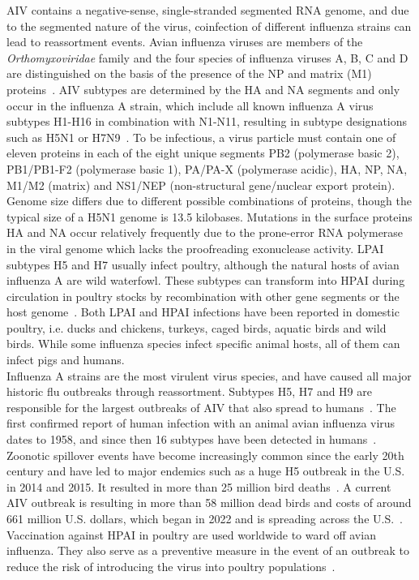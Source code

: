 \ac{AIV} contains a negative-sense, single-stranded segmented \ac{RNA} genome, and due to the segmented nature of the virus, coinfection of different influenza strains can lead to reassortment events. Avian influenza viruses are members of the \textit{Orthomyxoviridae} family and the four species of influenza viruses A, B, C and D are distinguished on the basis of the presence of the \ac{NP} and matrix (M1) proteins~\cite{webster1992evolution}. \ac{AIV} subtypes are determined by the \ac{HA} and \ac{NA} segments and only occur in the influenza A strain, which include all known influenza A virus subtypes H1-H16 in combination with N1-N11, resulting in subtype designations such as H5N1 or H7N9~\cite{webster1992evolution, krammer2018influenza}. To be infectious, a virus particle must contain one of eleven proteins in each of the eight unique segments PB2 (polymerase basic 2), PB1/PB1-F2 (polymerase basic 1), PA/PA-X (polymerase acidic), \ac{HA}, \ac{NP}, \ac{NA}, M1/M2 (matrix) and NS1/NEP (non-structural gene/nuclear export protein). Genome size differs due to different possible combinations of proteins, though the typical size of a H5N1 genome is 13.5 kilobases. Mutations in the surface proteins \ac{HA} and \ac{NA} occur relatively frequently due to the prone-error \ac{RNA} polymerase in the viral genome which lacks the proofreading exonuclease activity. \ac{LPAI} subtypes H5 and H7 usually infect poultry, although the natural hosts of avian influenza A are wild waterfowl. These subtypes can transform into \ac{HPAI} during circulation in poultry stocks by recombination with other gene segments or the host genome~\cite{webster2006h5n1}. Both \ac{LPAI} and \ac{HPAI} infections have been reported in domestic poultry, i.e. ducks and chickens, turkeys, caged birds, aquatic birds and wild birds. While some influenza species infect specific animal hosts, all of them can infect pigs and humans. \\
Influenza A strains are the most virulent virus species, and have caused all major historic flu outbreaks through reassortment. Subtypes H5, H7 and H9 are responsible for the largest outbreaks of \ac{AIV} that also spread to humans~\cite{widdowson2017global}. The first confirmed report of human infection with an animal avian influenza virus dates to 1958, and since then 16 subtypes have been detected in humans~\cite{kluska1961demonstration}. Zoonotic spillover events have become increasingly common since the early 20th century and have led to major endemics such as a huge H5 outbreak in the U.S. in 2014 and 2015. It resulted in more than 25 million bird deaths~\cite{seeger2021poultry}. A current \ac{AIV} outbreak is resulting in more than 58 million dead birds and costs of around 661 million U.S. dollars, which began in 2022 and is spreading across the U.S.~\cite{usda2023hpai}. 
Vaccination against \ac{HPAI} in poultry are used worldwide to ward off avian influenza. They also serve as a preventive measure in the event of an outbreak to reduce the risk of introducing the virus into poultry populations~\cite{swayne2013current, swayne2011assessment}. 

